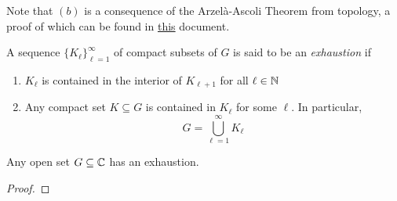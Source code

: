 Note that $(b)$ is a consequence of the Arzel\`a-Ascoli Theorem from topology, a proof of which can be found in \href{https://swayamchube.github.io/research-interests/topology/main.pdf}{this} document.

\begin{definition}
    A sequence $\{K_\ell\}_{\ell = 1}^\infty$ of compact subsets of $G$ is said to be an \textit{exhaustion} if 
    \begin{enumerate}[label=(\alph*)]
        \item $K_\ell$ is contained in the interior of $K_{\ell + 1}$ for all $\ell\in\mathbb{N}$
        \item Any compact set $K\subseteq G$ is contained in $K_\ell$ for some $\ell$. In particular, 
        \begin{equation*}
            G = \bigcup_{\ell = 1}^\infty K_\ell
        \end{equation*}
    \end{enumerate}
\end{definition}

\begin{lemma}
    Any open set $G\subseteq\mathbb{C}$ has an exhaustion.
\end{lemma}
\begin{proof}
    
\end{proof}


